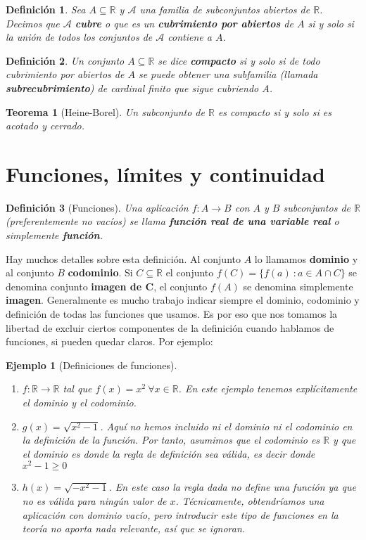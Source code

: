 \documentclass{article}
\newtheorem{theorem}{Teorema}
\newtheorem{define}{Definición}
\newtheorem{ejem}{Ejemplo}
\newcommand{\reales}{\mathbb{R}}
\begin{document}
\begin{define}
	Sea $A \subseteq \reales$ y $\mathcal{A}$ una familia de subconjuntos abiertos de $\reales$. Decimos que $\mathcal{A}$ \textbf{cubre} o que es un \textbf{cubrimiento por abiertos} de $A$ si y solo si la unión de todos los conjuntos de $\mathcal{A}$ contiene a $A$.
\end{define}

\begin{define}
	Un conjunto $A \subseteq \reales$ se dice \textbf{compacto} si y solo si de todo cubrimiento por abiertos de $A$ se puede obtener una subfamilia (llamada \textbf{subrecubrimiento}) de cardinal finito que sigue cubriendo $A$.
\end{define}

\begin{theorem}[Heine-Borel]
	Un subconjunto de $\reales$ es compacto si y solo si es acotado y cerrado.
\end{theorem}




\newpage
\section{Funciones, límites y continuidad}
\begin{define}[Funciones]
	Una aplicación $f:A \rightarrow B$ con $A$ y $B$ subconjuntos de $\reales$ (preferentemente no vacíos) se llama \textbf{función real de una variable real} o simplemente \textbf{función}.
\end{define}

Hay muchos detalles sobre esta definición. Al conjunto $A$ lo llamamos \textbf{dominio} y al conjunto $B$ \textbf{codominio}. Si $C \subseteq \reales$ el conjunto $f(C) = \{f(a)\ : a \in A \cap C \}$ se denomina conjunto \textbf{imagen de C}, el conjunto $f(A)$ se denomina simplemente \textbf{imagen}. Generalmente es mucho trabajo indicar siempre el dominio, codominio y definición de todas las funciones que usamos. Es por eso que nos tomamos la libertad de excluir ciertos componentes de la definición cuando hablamos de funciones, si pueden quedar claros. Por ejemplo: 

\begin{ejem}[Definiciones de funciones]
	\begin{enumerate}
		\item
		$f:\reales \rightarrow \reales$ tal que $f(x) = x^2\ \forall x \in \reales$. En este ejemplo tenemos explícitamente el dominio y el codominio.
		\item
		$g(x) = \sqrt{x^2 - 1}$. Aquí no hemos incluido ni el dominio ni el codominio en la definición de la función. Por tanto, asumimos que el codominio es $\reales$ y que el dominio es donde la regla de definición sea válida, es decir donde $x^2 - 1 \geq 0$
		\item
		$h(x) = \sqrt{-x^2 - 1}$. En este caso la regla dada no define una función ya que no es válida para ningún valor de $x$. Técnicamente, obtendríamos una aplicación con dominio vacío, pero introducir este tipo de funciones en la teoría no aporta nada relevante, así que se ignoran.
	\end{enumerate}
\end{ejem}
\end{document}
